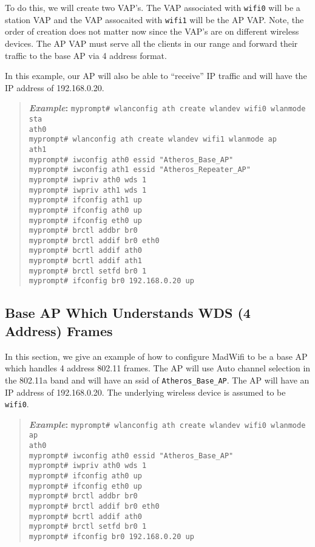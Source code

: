\documentclass[10pt,fullpage]{article}
\newcommand{\mytt}[1]{{\texttt{#1}}}
\newcommand{\cmd}[1]{{\texttt{myprompt\# #1}}}
\newenvironment{example}{\begin{quote}\textbf{\textit{Example}:}}{\end{quote}}
\begin{document}
To do this, we will create two VAP's.  The VAP associated with
\mytt{wifi0} will be a station VAP and the VAP assocaited with
\mytt{wifi1} will be the AP VAP.  Note, the order of creation does not
matter now since the VAP's are on different wireless devices.  The AP
VAP must serve all the clients in our range and forward their traffic
to the base AP via 4 address format.  

In this example, our AP will also be able to ``receive'' IP traffic
and will have the IP address of 192.168.0.20.
\begin{example}
  \cmd{wlanconfig ath create wlandev wifi0 wlanmode sta}\\
  \mytt{ath0}\\
  \cmd{wlanconfig ath create wlandev wifi1 wlanmode ap}\\
  \mytt{ath1}\\
  \cmd{iwconfig ath0 essid "Atheros\_Base\_AP"}\\
  \cmd{iwconfig ath1 essid "Atheros\_Repeater\_AP"}\\
  \cmd{iwpriv ath0 wds 1}\\
  \cmd{iwpriv ath1 wds 1}\\
  \cmd{ifconfig ath1 up}\\
  \cmd{ifconfig ath0 up}\\
  \cmd{ifconfig eth0 up}\\
  \cmd{brctl addbr br0}\\
  \cmd{brctl addif br0 eth0}\\
  \cmd{bcrtl addif ath0}\\
  \cmd{bcrtl addif ath1}\\
  \cmd{brctl setfd br0 1}\\
  \cmd{ifconfig br0 192.168.0.20 up}
\end{example}

\subsection{Base AP Which Understands WDS (4 Address) Frames}
In this section, we give an example of how to configure MadWifi to be
a base AP which handles 4 address 802.11 frames.  The AP will use Auto
channel selection in the 802.11a band and will have an ssid of
\mytt{Atheros\_Base\_AP}. The AP will have an IP address of
192.168.0.20.  The underlying wireless device is assumed to be
\mytt{wifi0}.
\begin{example}
  \cmd{wlanconfig ath create wlandev wifi0 wlanmode ap}\\
  \mytt{ath0}\\
  \cmd{iwconfig ath0 essid "Atheros\_Base\_AP"}\\
  \cmd{iwpriv ath0 wds 1}\\
  \cmd{ifconfig ath0 up}\\
  \cmd{ifconfig eth0 up}\\
  \cmd{brctl addbr br0}\\
  \cmd{brctl addif br0 eth0}\\
  \cmd{bcrtl addif ath0}\\
  \cmd{brctl setfd br0 1}\\
  \cmd{ifconfig br0 192.168.0.20 up}
\end{example}
\end{document}
